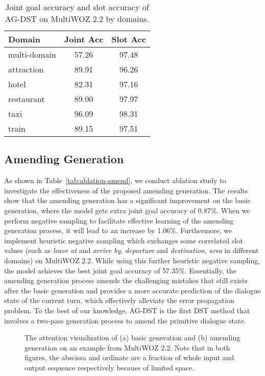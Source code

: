 \documentclass[11pt]{article}
\begin{document}
\begin{table}
\centering
\begin{tabular}{lcc}
\hline
\textbf{Domain} & \textbf{Joint Acc} & \textbf{Slot Acc} \\
\hline
\hline
multi-domain & 57.26 & 97.48 \\
\hline
attraction & 89.91 & 96.26 \\
hotel & 82.31 & 97.16 \\
restaurant & 89.00 & 97.97 \\
taxi & 96.09 & 98.31 \\
train & 89.15 & 97.51 \\
\hline
\end{tabular}
\caption{Joint goal accuracy and slot accuracy of AG-DST on MultiWOZ 2.2 by domains.}\label{tab:jga-domain}
\end{table}

\subsection{Amending Generation}
As shown in Table~\ref{tab:ablation-amend}, we conduct ablation study to investigate the effectiveness of the proposed amending generation. The results show that the amending generation has a significant improvement on the basic generation, where the model gets extra joint goal accuracy of 0.87\%. When we perform negative sampling to facilitate effective learning of the amending generation process, it will lead to an increase by 1.06\%. Furthermore, we implement heuristic negative sampling which exchanges some correlated slot values (such as \textit{leave at} and \textit{arrive by}, \textit{departure} and \textit{destination}, \textit{area} in different domains) on MultiWOZ 2.2. While using this further heuristic negative sampling, the model achieves the best joint goal accuracy of 57.35\%. 
Essentially, the amending generation process amends the challenging mistakes that still exists after the basic generation and provides a more accurate prediction of the dialogue state of the current turn, which effectively alleviate the error propagation problem.
To the best of our knowledge, AG-DST is the first DST method that involves a two-pass generation process to amend the primitive dialogue state. 


\begin{figure}
	\centering
	\hspace{1 em}
	\caption{The attention visualization of (a) basic generation and (b) amending generation on an example from MultiWOZ 2.2. Note that in both figures, the abscissa and ordinate are a fraction of whole input and output sequence respectively because of limited space.}
	\label{fig:attention}
\end{figure}
\end{document}
